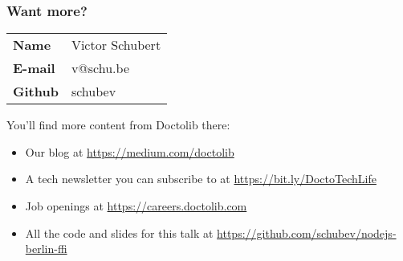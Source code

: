 \begin{frame}
	\frametitle{Want more?}

	\begin{center}
	\Large
	\begin{tabular}{>{\bfseries}ll}
		Name & Victor Schubert \\
		E-mail & v@schu.be \\
		Github & schubev \\
	\end{tabular}
		\vspace{1em}
	\newline
	\end{center}

	\large
	You’ll find more content from Doctolib there:
	\begin{itemize}
	\item Our blog at \url{https://medium.com/doctolib}
	\item A tech newsletter you can subscribe to at \url{https://bit.ly/DoctoTechLife}
	\item Job openings at \url{https://careers.doctolib.com}
	\item All the code and slides for this talk at \url{https://github.com/schubev/nodejs-berlin-ffi}
	\end{itemize}

\end{frame}
